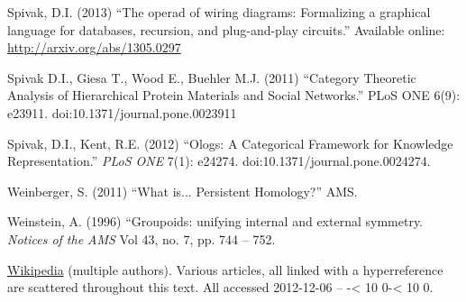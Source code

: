 \begin{thebibliography}{SGWB}
 Spivak, D.I. (2013) ``The operad of wiring diagrams: Formalizing a graphical language for databases, recursion, and plug-and-play circuits.'' Available online: \url{http://arxiv.org/abs/1305.0297}

 Spivak D.I., Giesa T., Wood E., Buehler M.J. (2011) ``Category Theoretic Analysis of Hierarchical Protein Materials and Social Networks.'' PLoS ONE 6(9): e23911. doi:10.1371/journal.pone.0023911

 Spivak, D.I., Kent, R.E. (2012) ``Ologs: A Categorical Framework for Knowledge Representation.'' \textit{PLoS ONE} 7(1): e24274. doi:10.1371/journal.pone.0024274.

 Weinberger, S. (2011) ``What is... Persistent Homology?'' AMS.

 Weinstein, A. (1996) ``Groupoids: unifying internal and external symmetry. \textit{Notices of the AMS} Vol 43, no. 7, pp. 744 -- 752.

 \href{http://www.wikipedia.org}{\text Wikipedia} (multiple authors). Various articles, all linked with a hyperreference are scattered throughout this text. All accessed 2012-12-06 -- \the \year-{\ifnum \month < 10 0\the\month \else \the\month \fi}-{\ifnum \day < 10 0\the\day \else \the\day \fi}.

\end{thebibliography}

